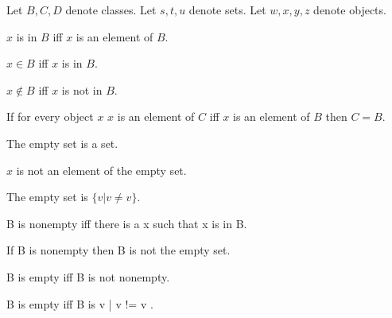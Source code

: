 \documentclass{article}
\begin{document}
  \begin{forthel}

    Let $B, C, D$ denote classes.
    Let $s, t, u$ denote sets.
    Let $w, x, y, z$ denote objects.

    \begin{definition}
      $x$ is in $B$ iff $x$ is an element of $B$.
    \end{definition}

    \begin{definition}
      $x \in B$ iff $x$ is in $B$.
    \end{definition}

    \begin{definition}
      $x \notin B$ iff $x$ is not in $B$.
    \end{definition}

    \begin{axiom}[Ext]
      If for every object $x$ $x$ is an element of $C$ iff $x$ is an element of $B$ then $C = B$.
    \end{axiom}

    \begin{signature}
      The empty set is a set.
    \end{signature}

    \begin{axiom}[Empty]
      $x$ is not an element of the empty set.
    \end{axiom}

    \begin{lemma}
      The empty set is $\{ v | v \neq v \}$.
    \end{lemma}

    \begin{definition}
      B is nonempty iff there is a x such that x is in B.
    \end{definition}

    \begin{lemma}
      If B is nonempty then B is not the empty set.
    \end{lemma}

    \begin{definition}
      B is empty iff B is not nonempty.
    \end{definition}

    \begin{lemma}
      B is empty iff B is { v | v != v }.
    \end{lemma}


\end{forthel}
\end{document}
